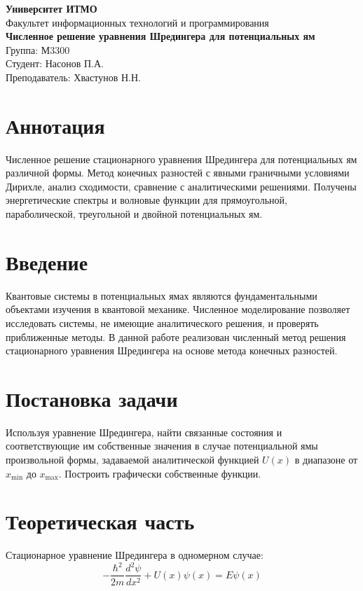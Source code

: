 \documentclass[12pt,a4paper]{article}
\newcommand{\university}{Университет ИТМО}
\newcommand{\faculty}{Факультет информационных технологий и программирования}
\newcommand{\titletext}{Численное решение уравнения Шредингера для потенциальных ям}
\newcommand{\group}{Группа: М3300}
\newcommand{\students}{Студент: Насонов П.А.}
\newcommand{\supervisor}{Преподаватель: Хвастунов Н.Н.}
\begin{document}
\begin{center}
  {\Large \textbf{\university}}\\[0.3em]
  {\large \faculty}\\[2em]
  {\LARGE \textbf{\titletext}}\\[1.5em]
  {\large \group}\\[0.3em]
  {\large \students}\\[0.3em]
  {\large \supervisor}\\[2em]
\end{center}

\section*{Аннотация}
Численное решение стационарного уравнения Шредингера для потенциальных ям различной формы. Метод конечных разностей с явными граничными условиями Дирихле, анализ сходимости, сравнение с аналитическими решениями. Получены энергетические спектры и волновые функции для прямоугольной, параболической, треугольной и двойной потенциальных ям.

\section{Введение}
Квантовые системы в потенциальных ямах являются фундаментальными объектами изучения в квантовой механике. Численное моделирование позволяет исследовать системы, не имеющие аналитического решения, и проверять приближенные методы. В данной работе реализован численный метод решения стационарного уравнения Шредингера на основе метода конечных разностей.

\section{Постановка задачи}
Используя уравнение Шредингера, найти связанные состояния и соответствующие им собственные значения в случае потенциальной ямы произвольной формы, задаваемой аналитической функцией $U(x)$ в диапазоне от $x_{\min}$ до $x_{\max}$. Построить графически собственные функции.

\section{Теоретическая часть}
Стационарное уравнение Шредингера в одномерном случае:
\begin{equation}
-\frac{\hbar^2}{2m}\frac{d^2\psi}{dx^2} + U(x)\psi(x) = E\psi(x)
\end{equation}
\end{document}
